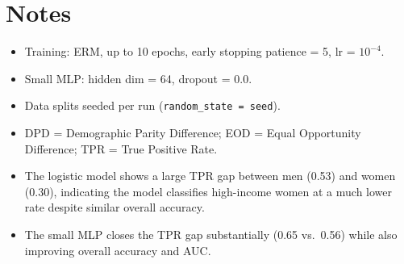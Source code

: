\documentclass[11pt]{article}
\begin{document}
\section*{Notes}

\begin{itemize}
  \item Training: ERM, up to 10 epochs, early stopping patience = 5, lr = $10^{-4}$.
  \item Small MLP: hidden dim = 64, dropout = 0.0.
  \item Data splits seeded per run (\texttt{random\_state = seed}).
  \item DPD = Demographic Parity Difference; EOD = Equal Opportunity Difference; TPR = True Positive Rate.
  \item The logistic model shows a large TPR gap between men (0.53) and women (0.30), indicating the model classifies high-income women at a much lower rate despite similar overall accuracy.
  \item The small MLP closes the TPR gap substantially (0.65 vs.\ 0.56) while also improving overall accuracy and AUC.
\end{itemize}
\end{document}
